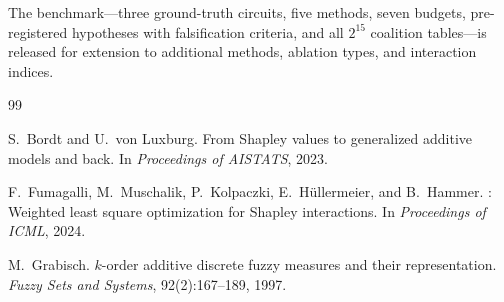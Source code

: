 \documentclass[11pt]{article}
\begin{document}
The benchmark---three ground-truth circuits, five methods, seven
budgets, pre-registered hypotheses with falsification criteria, and
all $2^{15}$ coalition tables---is released for extension to
additional methods, ablation types, and interaction indices.





\begin{thebibliography}{99}

S.~Bordt and U.~von Luxburg.
\newblock From Shapley values to generalized additive models and back.
\newblock In \emph{Proceedings of AISTATS}, 2023.

F.~Fumagalli, M.~Muschalik, P.~Kolpaczki, E.~H{\"u}llermeier, and
  B.~Hammer.
: Weighted least square optimization for Shapley
  interactions.
\newblock In \emph{Proceedings of ICML}, 2024.

M.~Grabisch.
\newblock $k$-order additive discrete fuzzy measures and their representation.
\newblock \emph{Fuzzy Sets and Systems}, 92(2):167--189, 1997.

\end{thebibliography}
\end{document}
